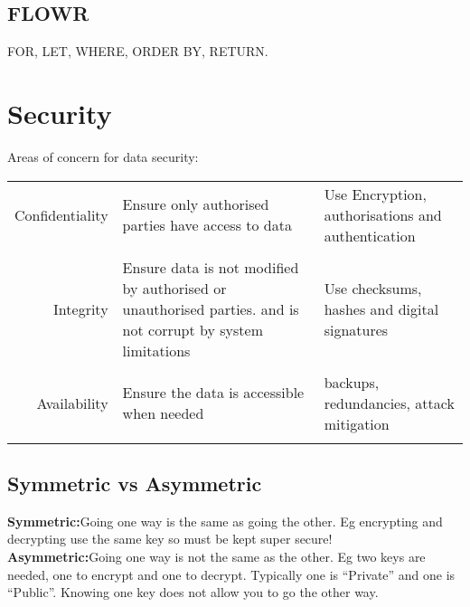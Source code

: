 \documentclass[10pt]{article}
\begin{document}
    \subsection*{FLOWR}
       FOR, LET, WHERE, ORDER BY, RETURN.

  \section*{Security}
    Areas of concern for data security:\\
    \begin{tabular}{r | p{6cm} | p{6cm} } 
      Confidentiality & Ensure only authorised parties have access to data & Use Encryption, authorisations and authentication\\ & & \\
      Integrity & Ensure data is not modified by authorised or unauthorised parties. and is not corrupt by system limitations & Use checksums, hashes and digital signatures\\ & & \\
      Availability & Ensure the data is accessible when needed & backups, redundancies, attack mitigation\\ & & \\
    \end{tabular}

    \subsection*{Symmetric vs Asymmetric}
      \textbf{Symmetric:}Going one way is the same as going the other. Eg encrypting and decrypting use the same key so must be kept super secure!\\
      \textbf{Asymmetric:}Going one way is not the same as the other. Eg two keys are needed, one to encrypt and one to decrypt. Typically one is ``Private'' and one is ``Public''. Knowing one key does not allow you to go the other way.
\end{document}
